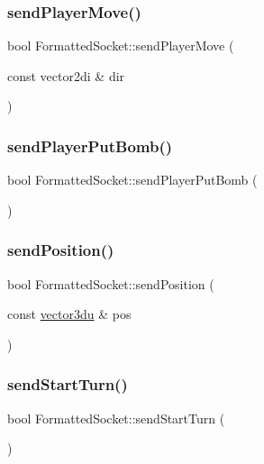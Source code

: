 \subsubsection{\texorpdfstring{sendPlayerMove()}{sendPlayerMove()}}
{\footnotesize\ttfamily bool Formatted\+Socket\+::send\+Player\+Move (\begin{DoxyParamCaption}\item[{const vector2di \&}]{dir }\end{DoxyParamCaption})}

\mbox{\label{class_formatted_socket_a860290cd091d23c760666d3f03defa15}} 
\subsubsection{\texorpdfstring{sendPlayerPutBomb()}{sendPlayerPutBomb()}}
{\footnotesize\ttfamily bool Formatted\+Socket\+::send\+Player\+Put\+Bomb (\begin{DoxyParamCaption}{ }\end{DoxyParamCaption})}

\mbox{\label{class_formatted_socket_a6acbe9fe124185752a3ff4f62f73be57}} 
\subsubsection{\texorpdfstring{sendPosition()}{sendPosition()}}
{\footnotesize\ttfamily bool Formatted\+Socket\+::send\+Position (\begin{DoxyParamCaption}\item[{const \mbox{\hyperlink{_utility_8hpp_ac675fa2b6c79d0be47ae76e5d0ce38a8}{vector3du}} \&}]{pos }\end{DoxyParamCaption})}

\mbox{\label{class_formatted_socket_a5c58704fe70fe65a7fd792b525f91fba}} 
\subsubsection{\texorpdfstring{sendStartTurn()}{sendStartTurn()}}
{\footnotesize\ttfamily bool Formatted\+Socket\+::send\+Start\+Turn (\begin{DoxyParamCaption}{ }\end{DoxyParamCaption})}



